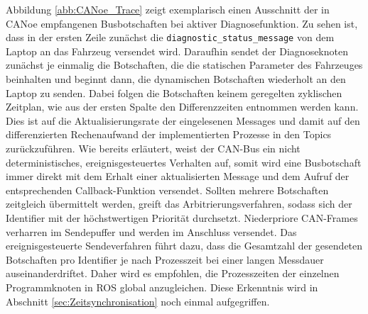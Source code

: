 Abbildung \ref{abb:CANoe_Trace} zeigt exemplarisch einen Ausschnitt der in CANoe empfangenen Busbotschaften bei aktiver Diagnosefunktion. Zu sehen ist, dass in der ersten Zeile zunächst die \texttt{diagnostic\_status\_message} von dem Laptop an das Fahrzeug versendet wird. Daraufhin sendet der Diagnoseknoten zunächst je einmalig die Botschaften, die die statischen Parameter des Fahrzeuges beinhalten und beginnt dann, die dynamischen Botschaften wiederholt an den Laptop zu senden. Dabei folgen die Botschaften keinem geregelten zyklischen Zeitplan, wie aus der ersten Spalte den Differenzzeiten entnommen werden kann. Dies ist auf die Aktualisierungsrate der eingelesenen Messages und damit auf den differenzierten Rechenaufwand der implementierten Prozesse in den Topics zurückzuführen. Wie bereits erläutert, weist der CAN-Bus ein nicht deterministisches, ereignisgesteuertes Verhalten auf, somit wird eine Busbotschaft immer direkt mit dem Erhalt einer aktualisierten Message und dem Aufruf der entsprechenden Callback-Funktion versendet. Sollten mehrere Botschaften zeitgleich übermittelt werden, greift das Arbitrierungsverfahren, sodass sich der Identifier mit der höchstwertigen Priorität durchsetzt. Niederpriore CAN-Frames verharren im Sendepuffer und werden im Anschluss versendet. Das ereignisgesteuerte Sendeverfahren führt dazu, dass die Gesamtzahl der gesendeten Botschaften pro Identifier je nach Prozesszeit bei einer langen Messdauer auseinanderdriftet. Daher wird es empfohlen, die Prozesszeiten der einzelnen Programmknoten in ROS global anzugleichen. Diese Erkenntnis wird in Abschnitt \ref{sec:Zeitsynchronisation} noch einmal aufgegriffen.\\ 


